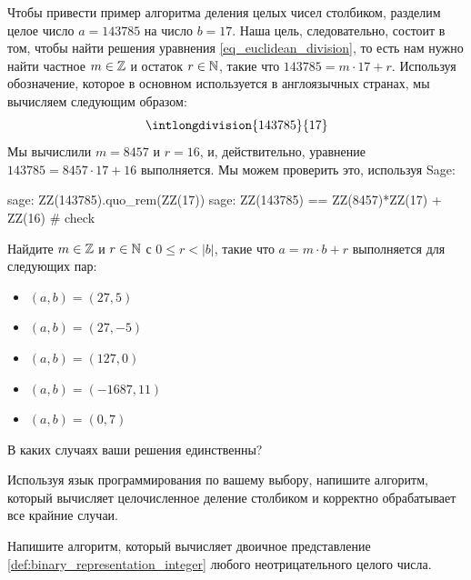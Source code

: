 \begin{example} Чтобы привести пример алгоритма деления целых чисел столбиком, разделим целое число $a=143785$ на число $b=17$. Наша цель, следовательно, состоит в том, чтобы найти решения уравнения \ref{eq_euclidean_division}, то есть нам нужно найти частное $m\in\mathbb{Z}$ и остаток $r \in \mathbb{N}$, такие что $143785 = m\cdot 17 + r$. Используя обозначение, которое в основном используется в англоязычных странах, мы вычисляем следующим образом:
\begin{equation}
\intlongdivision{143785}{17}
\end{equation}
Мы вычислили $m=8457$ и $r=16$, и, действительно, уравнение $143785 = 8457\cdot 17 + 16$ выполняется. Мы можем проверить это, используя Sage:
\begin{sagecommandline}
sage: ZZ(143785).quo_rem(ZZ(17))
sage: ZZ(143785) == ZZ(8457)*ZZ(17) + ZZ(16) # check
\end{sagecommandline}

\end{example}
\begin{exercise}
Найдите $m\in\mathbb{Z}$ и $r\in\mathbb{N}$ с $0\leq r< |b|$, такие что $a= m\cdot b +r$ выполняется для следующих пар:
\begin{itemize}\compactlist{}
 \item $(a,b) = (27,5)$ 
 \item $(a,b)=(27,-5)$
 \item $(a,b)=(127,0)$
 \item $(a,b)= (-1687, 11)$
 \item $(a,b)= (0, 7)$
 \end{itemize}
 В каких случаях ваши решения единственны?
\end{exercise}
\begin{exercise}
Используя язык программирования по вашему выбору, напишите алгоритм, который вычисляет целочисленное деление столбиком и корректно обрабатывает все крайние случаи.
\end{exercise}
\begin{exercise}
Напишите алгоритм, который вычисляет двоичное представление \ref{def:binary_representation_integer} любого неотрицательного целого числа.
\end{exercise}


